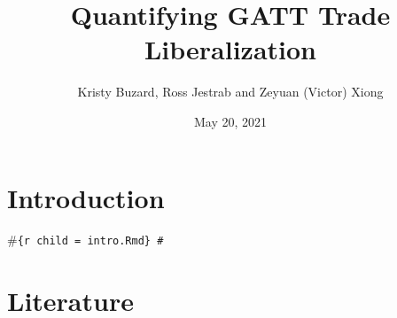 \documentclass[
  12pt,
]{article}
\title{Quantifying GATT Trade Liberalization}
\author{Kristy Buzard, Ross Jestrab and Zeyuan (Victor) Xiong}
\date{May 20, 2021}
\begin{document}
\maketitle

\hypertarget{introduction}{%
\section{Introduction}\label{introduction}}

\#\texttt{\{r\ child\ =\ \textquotesingle{}intro.Rmd\textquotesingle{}\}\ \#}

\hypertarget{literature}{%
\section{Literature}\label{literature}}
\end{document}
